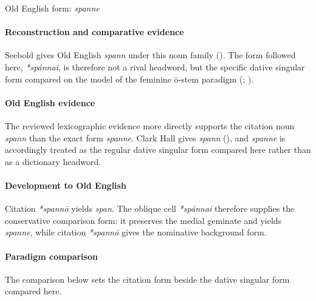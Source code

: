 \documentclass[
  british,
  a4paper,
]{article}
\begin{document}
Old English form: \emph{spanne}

\paragraph{Reconstruction and comparative
evidence}\label{reconstruction-and-comparative-evidence-55}

Seebold gives Old English \emph{spann} under this noun family
(). The form followed here,
\emph{*spánnai}, is therefore not a rival headword, but the specific
dative singular form compared on the model of the feminine ō-stem
paradigm (;
).

\paragraph{Old English evidence}\label{old-english-evidence-55}

The reviewed lexicographic evidence more directly supports the citation
noun \emph{spann} than the exact form \emph{spanne}. Clark Hall gives
\emph{spann} (), and
\emph{spanne} is accordingly treated as the regular dative singular form
compared here rather than as a dictionary headword.

\paragraph{Development to Old
English}\label{development-to-old-english-55}

Citation \emph{*spannō} yields \emph{span}. The oblique cell
\emph{*spánnai} therefore supplies the conservative comparison form: it
preserves the medial geminate and yields \emph{spanne}, while citation
\emph{*spannō} gives the nominative background form.

\paragraph{Paradigm comparison}\label{paradigm-comparison-16}

The comparison below sets the citation form beside the dative singular
form compared here.
\end{document}
